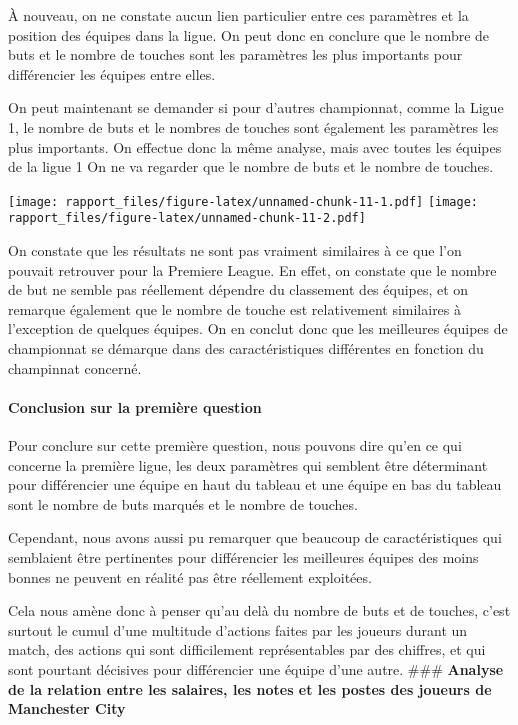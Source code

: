 \documentclass[
]{article}
\begin{document}
À nouveau, on ne constate aucun lien particulier entre ces paramètres et
la position des équipes dans la ligue. On peut donc en conclure que le
nombre de buts et le nombre de touches sont les paramètres les plus
importants pour différencier les équipes entre elles.

On peut maintenant se demander si pour d'autres championnat, comme la
Ligue 1, le nombre de buts et le nombres de touches sont également les
paramètres les plus importants. On effectue donc la même analyse, mais
avec toutes les équipes de la ligue 1 On ne va regarder que le nombre de
buts et le nombre de touches.

\texttt{[image: rapport\_files/figure-latex/unnamed-chunk-11-1.pdf]}
\texttt{[image: rapport\_files/figure-latex/unnamed-chunk-11-2.pdf]}

On constate que les résultats ne sont pas vraiment similaires à ce que
l'on pouvait retrouver pour la Premiere League. En effet, on constate
que le nombre de but ne semble pas réellement dépendre du classement des
équipes, et on remarque également que le nombre de touche est
relativement similaires à l'exception de quelques équipes. On en conclut
donc que les meilleures équipes de championnat se démarque dans des
caractéristiques différentes en fonction du champinnat concerné.

\paragraph{Conclusion sur la première
question}\label{conclusion-sur-la-premiuxe8re-question}

Pour conclure sur cette première question, nous pouvons dire qu'en ce
qui concerne la première ligue, les deux paramètres qui semblent être
déterminant pour différencier une équipe en haut du tableau et une
équipe en bas du tableau sont le nombre de buts marqués et le nombre de
touches.

Cependant, nous avons aussi pu remarquer que beaucoup de
caractéristiques qui semblaient être pertinentes pour différencier les
meilleures équipes des moins bonnes ne peuvent en réalité pas être
réellement exploitées.

Cela nous amène donc à penser qu'au delà du nombre de buts et de
touches, c'est surtout le cumul d'une multitude d'actions faites par les
joueurs durant un match, des actions qui sont difficilement
représentables par des chiffres, et qui sont pourtant décisives pour
différencier une équipe d'une autre. \#\#\# \textbf{Analyse de la
relation entre les salaires, les notes et les postes des joueurs de
Manchester City}
\end{document}
